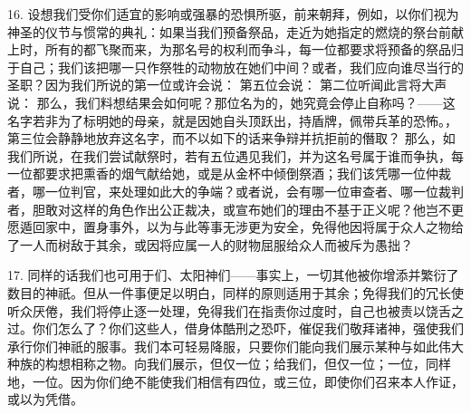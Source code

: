 16. 设想我们受你们适宜的影响或强暴的恐惧所驱，前来朝拜，例如，以你们视为神圣的仪节与惯常的典礼：如果当我们预备祭品，走近为她指定的燃烧的祭台前献上时，所有的都飞聚而来，为那名号的权利而争斗，每一位都要求将预备的祭品归于自己；我们该把哪一只作祭牲的动物放在她们中间？或者，我们应向谁尽当行的圣职？因为我们所说的第一位或许会说： 第五位会说： 第二位听闻此言将大声说： 那么，我们料想结果会如何呢？那位名为的，她究竟会停止自称吗？——这名字若非为了标明她的母亲，就是因她自头顶跃出，持盾牌，佩带兵革的恐怖。，第三位会静静地放弃这名字，而不以如下的话来争辩并抗拒前的僭取？ 那么，如我们所说，在我们尝试献祭时，若有五位遇见我们，并为这名号属于谁而争执，每一位都要求把熏香的烟气献给她，或是从金杯中倾倒祭酒；我们该凭哪一位仲裁者，哪一位判官，来处理如此大的争端？或者说，会有哪一位审查者、哪一位裁判者，胆敢对这样的角色作出公正裁决，或宣布她们的理由不基于正义呢？他岂不更愿遁回家中，置身事外，以为与此等事无涉更为安全，免得他因将属于众人之物给了一人而树敌于其余，或因将应属一人的财物屈服给众人而被斥为愚拙？\par

17. 同样的话我们也可用于们、太阳神们——事实上，一切其他被你增添并繁衍了数目的神祇。但从一件事便足以明白，同样的原则适用于其余；免得我们的冗长使听众厌倦，我们将停止逐一处理，免得我们在指责你过度时，自己也被责以饶舌之过。你们怎么了？你们这些人，借身体酷刑之恐吓，催促我们敬拜诸神，强使我们承行你们神祇的服事。我们本可轻易降服，只要你们能向我们展示某种与如此伟大种族的构想相称之物。向我们展示，但仅一位；给我们，但仅一位；一位，同样地，一位。因为你们绝不能使我们相信有四位，或三位，即使你们召来本人作证，或以为凭借。\par

